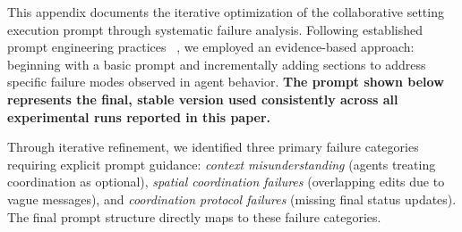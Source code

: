 This appendix documents the iterative optimization of the collaborative setting execution prompt through systematic failure analysis. Following established prompt engineering practices ~\citep{sahoo2024systematic,ramnath2025systematic}, we employed an evidence-based approach: beginning with a basic prompt and incrementally adding sections to address specific failure modes observed in agent behavior. \textbf{The prompt shown below represents the final, stable version used consistently across all experimental runs reported in this paper.}

Through iterative refinement, we identified three primary failure categories requiring explicit prompt guidance: \textit{context misunderstanding} (agents treating coordination as optional), \textit{spatial coordination failures} (overlapping edits due to vague messages), and \textit{coordination protocol failures} (missing final status updates). The final prompt structure directly maps to these failure categories.

